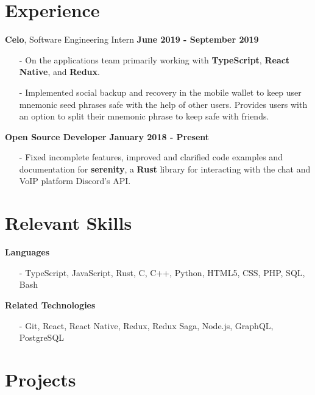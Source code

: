 \documentclass[margin,line]{res}
\begin{document}
\begin{resume}
\section{\sc Experience}
  {\bf Celo}, Software Engineering Intern \hfill {\bf June 2019 - September 2019} \\
  \vspace{-3.5mm}
  \begin{itemize} \itemsep -2pt
    \item[-] On the applications team primarily working with {\bf TypeScript},
    {\bf React Native}, and {\bf Redux}.
    \item[-] Implemented social backup and recovery in the mobile wallet to keep
    user mnemonic seed phrases safe with the help of other users. Provides
    users with an option to split their mnemonic phrase to keep safe with friends.
  \end{itemize}
  {\bf Open Source Developer} \hfill {\bf January 2018 - Present} \\
  \vspace{-3.5mm}
  \begin{itemize} \itemsep -2pt
    \item[-] Fixed incomplete features, improved and clarified code examples and documentation for
    {\bf serenity}, a {\bf Rust} library for interacting with the chat and VoIP platform Discord's API. 
  \end{itemize}

\section{\sc Relevant Skills}
  {\bf Languages}
  \begin{itemize} \itemsep -2pt
    \item[-] TypeScript, JavaScript, Rust, C, C++, Python, HTML5, CSS, PHP, SQL, Bash
  \end{itemize}
  {\bf Related Technologies}
  \begin{itemize} \itemsep -2pt
    \item[-] Git, React, React Native, Redux, Redux Saga, Node.js, GraphQL, PostgreSQL
  \end{itemize}

\section{\sc Projects}


\end{resume}
\end{document}
